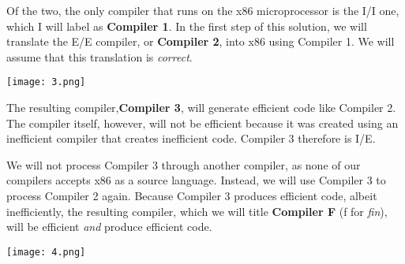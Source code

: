 \documentclass{article}
\begin{document}
Of the two, the only compiler that runs on the x86 microprocessor is the I/I one, which I will label as \textbf{Compiler 1}. In the first step of this solution, we will translate the E/E compiler, or \textbf{Compiler 2}, into x86 using Compiler 1. We will assume that this translation is \textit{correct}.
\linebreak

\texttt{[image: 3.png]}
\linebreak

The resulting compiler,\textbf{Compiler 3}, will generate efficient code like Compiler 2. The compiler itself, however, will not be efficient because it was created using an inefficient compiler that creates inefficient code. Compiler 3 therefore is I/E.
\linebreak

We will not process Compiler 3 through another compiler, as none of our compilers accepts x86 as a source language. Instead, we will use Compiler 3 to process Compiler 2 again. Because Compiler 3 produces efficient code, albeit inefficiently, the resulting compiler, which we will title \textbf{Compiler F} (f for \textit{fin}), will be efficient \textit{and} produce efficient code.
\linebreak

\texttt{[image: 4.png]}
\linebreak

\newpage
\end{document}
